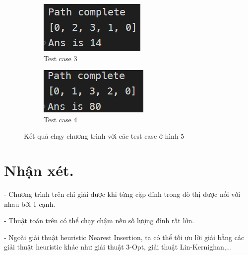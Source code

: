 \documentclass[a4paper, 11pt]{article}
\begin{document}
\begin{figure}[h]
  \bigskip
  \begin{subfigure}{.45\linewidth}
    \centering
    \includegraphics[width=\textwidth,height=\textheight,keepaspectratio]{res_3.png}
    \caption{Test case 3}
  \end{subfigure}
  \hfill
  \begin{subfigure}{.45\linewidth}
    \centering
    \includegraphics[width=\textwidth,height=\textheight,keepaspectratio]{res_4.png}
    \caption{Test case 4}
  \end{subfigure}
  \caption{Kết quả chạy chương trình với các test case ở hình 5}
\end{figure}


\section{Nhận xét.}
- Chương trình trên chỉ giải được khi từng cặp đỉnh trong đò thị được nối với nhau bởi 1 cạnh.

- Thuật toán trên có thể chạy chậm nếu số lượng đỉnh rất lớn.

- Ngoài giải thuật heuristic Nearest Insertion, ta có thể tối ưu lời giải bằng các giải thuật heuristic khác như giải thuật 3-Opt, giải thuật Lin-Kernighan,... 
\end{document}
